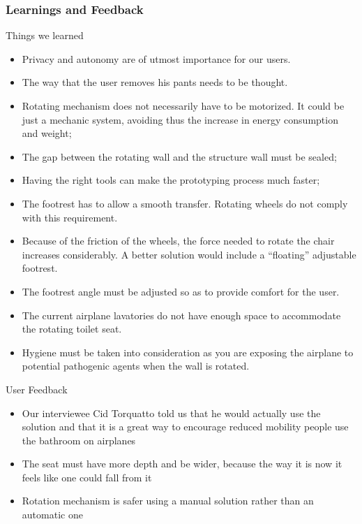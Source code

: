 \subsubsection{Learnings and Feedback}
Things we learned \\
\begin{itemize}
	\item Privacy and autonomy are of utmost importance for our users.
	\item The way that the user removes his pants needs to be thought.
	\item Rotating mechanism does not necessarily have to be motorized. It could be just a mechanic system, avoiding thus the increase in energy consumption and weight;
	\item The gap between the rotating wall and the structure wall must be sealed;
	\item Having the right tools can make the prototyping process much faster;
	\item The footrest has to allow a smooth transfer. Rotating wheels do not comply with this requirement. 
	\item Because of the friction of the wheels, the force needed to rotate the chair increases considerably. A better solution would include a “floating” adjustable footrest.
	\item 	The footrest angle must be adjusted so as to provide comfort for the user.
	\item 	The current airplane lavatories do not have enough space to accommodate the rotating toilet seat.
	\item Hygiene must be taken into consideration as you are exposing the airplane to potential pathogenic agents when the wall is rotated.
\end{itemize}

User Feedback \\

\begin{itemize}
	\item Our interviewee Cid Torquatto told us that he would actually use the solution and that it is a great way to encourage reduced mobility people use the bathroom on airplanes
	\item The seat must have more depth and be wider, because the way it is now it feels like one could fall from it
	\item Rotation mechanism is safer using a manual solution rather than an automatic one
\end{itemize}



